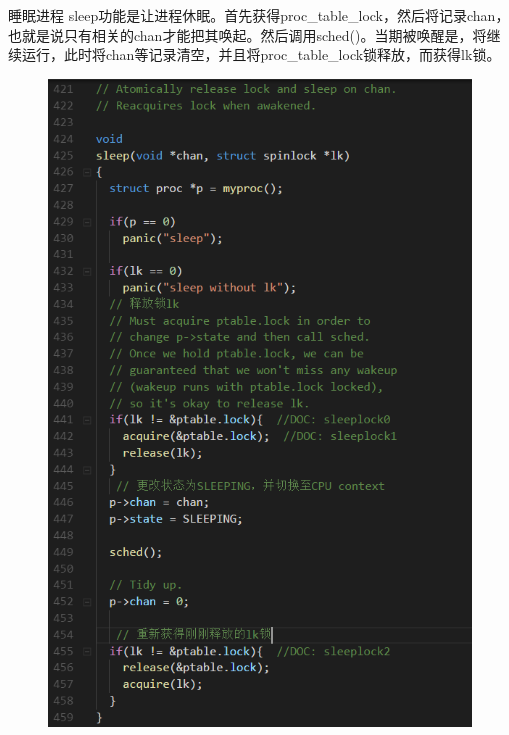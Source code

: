 \documentclass[a4paper,12pt]{report}
\begin{document}
睡眠进程
sleep功能是让进程休眠。首先获得proc\_table\_lock，然后将记录chan，也就是说只有相关的chan才能把其唤起。然后调用sched()。当期被唤醒是，将继续运行，此时将chan等记录清空，并且将proc\_table\_lock锁释放，而获得lk锁。
\begin{figure}[H]
	\centering
	\includegraphics [width=1.0\textwidth]{figure//image109.png}
\end{figure}
\end{document}
